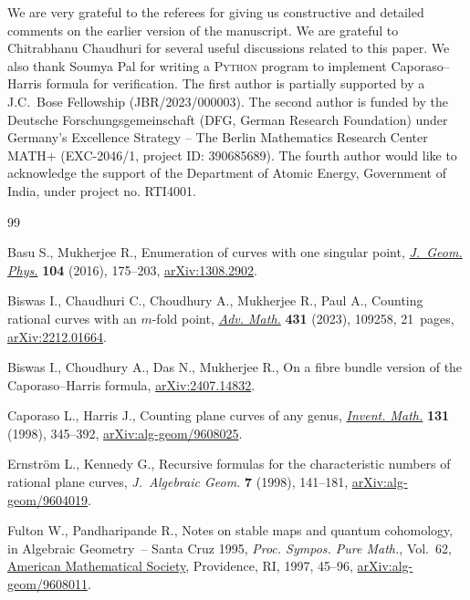 \documentclass[pdftex]{sigma}
\numberwithin{equation}{section}
\begin{document}
We are very grateful to the referees for giving us constructive
and detailed comments on the earlier version of the manuscript.
We are grateful to Chitrabhanu Chaudhuri for several useful discussions related to this paper. We also thank Soumya Pal for
writing a \textsc{Python} program to implement Caporaso--Harris formula for verification.
 The first author is partially supported by a J.C.~Bose Fellowship (JBR/2023/000003). The second author is
funded by the Deutsche Forschungsgemeinschaft (DFG, German Research
Foundation) under Germany's Excellence Strategy – The Berlin Mathematics
Research Center MATH+ (EXC-2046/1, project ID: 390685689).
The fourth author would like to acknowledge the support of the Department of Atomic Energy, Government of India, under project no. RTI4001.


\begin{thebibliography}{99}
\footnotesize\itemsep=0pt

Basu S., Mukherjee R., Enumeration of curves with one singular point,
 \href{https://doi.org/10.1016/j.geomphys.2016.02.008}{\textit{J.~Geom. Phys.}} \textbf{104} (2016), 175--203, \href{https://arxiv.org/abs/1308.2902}{arXiv:1308.2902}.

Biswas I., Chaudhuri C., Choudhury A., Mukherjee R., Paul A., Counting rational
 curves with an {$m$}-fold point, \href{https://doi.org/10.1016/j.aim.2023.109258}{\textit{Adv. Math.}} \textbf{431} (2023),
 109258, 21~pages, \href{https://arxiv.org/abs/2212.01664}{arXiv:2212.01664}.

Biswas I., Choudhury A., Das N., Mukherjee R., On a fibre bundle version of the
 {C}aporaso--{H}arris formula, \href{https://arxiv.org/abs/2407.14832}{arXiv:2407.14832}.

Caporaso L., Harris J., Counting plane curves of any genus,  \href{https://doi.org/10.1007/s002220050208}{\textit{Invent.
 Math.}} \textbf{131} (1998), 345--392, \href{https://arxiv.org/abs/alg-geom/9608025}{arXiv:alg-geom/9608025}.

Ernstr\"om L., Kennedy G., Recursive formulas for the characteristic numbers of
 rational plane curves, \textit{J.~Algebraic Geom.} \textbf{7} (1998),
 141--181, \href{https://arxiv.org/abs/alg-geom/9604019}{arXiv:alg-geom/9604019}.

Fulton W., Pandharipande R., Notes on stable maps and quantum cohomology, in
 Algebraic {G}eometry~-- {S}anta {C}ruz 1995, \textit{Proc. Sympos. Pure
 Math.}, Vol.~62, \href{https://doi.org/10.1090/pspum/062.2/1492534}{American Mathematical Society}, Providence, RI, 1997, 45--96,
 \href{https://arxiv.org/abs/alg-geom/9608011}{arXiv:alg-geom/9608011}.


\end{thebibliography}
\end{document}
